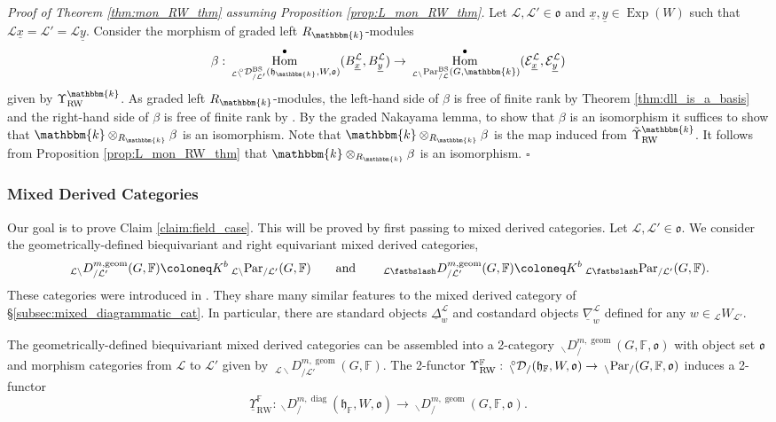 \documentclass{amsart}
\newcommand{\F}{\mathbb{F}}
\renewcommand{\k}{\mathbbm{k}}
\newcommand{\scrE}{\mathcal{E}}
\newcommand{\scrL}{\mathcal{L}}
\DeclareMathOperator{\Hom}{Hom}
\newcommand{\fr}[1]{\mathfrak{#1}}
\DeclareMathOperator{\RW}{RW}
\DeclareMathOperator{\diag}{diag}
\DeclareMathOperator{\BS}{BS}
\DeclareMathOperator{\geom}{geom}
\newcommand{\DGEE}[2]{\:_{#1 \backslash} D_{/ #2}^{m, \geom} }
\newcommand{\DGME}[2]{\:_{#1 \smallleftdash} D_{/ #2}^{m, \geom}}
\newcommand{\PME}[2]{\:_{#1 \smallleftdash} \textnormal{Par}_{/ #2} }
\newcommand{\PEE}[2]{\:_{#1 \backslash} \textnormal{Par}_{/ #2} }
\newcommand{\grEWmon}[2]{\:_{#1 \backslash} \!\! {}^{\circ} \mathcal{D}_{/ #2} }
\newcommand{\DDBE}[2]{\:_{#1 \backslash} D_{/ #2}^{m, \diag}}
\DeclareMathOperator{\Exp}{Exp}
\newcommand{\W}[2]{{}_{#1}W_{#2}}
\newcommand{\ux}{\underline{x}}
\newcommand{\uy}{\underline{y}}
\newcommand{\bfslash}{\mathbin{\fatbslash}}
\newcommand*\smallleftdash{\bfslash}
\theoremstyle{definition}
\newenvironment{midsecproof}[1]{\vspace{\topsep} \noindent \textit{Proof of #1.}}{\hfill $\square$}
\numberwithin{equation}{subsection}
\begin{document}
\begin{midsecproof}{Theorem \ref{thm:mon_RW_thm} assuming Proposition \ref{prop:L_mon_RW_thm}}
  Let $\scrL, \scrL' \in \fr{o}$ and $\ux, \uy \in \Exp (W)$ such that $\scrL \ux = \scrL' = \scrL \uy$.
  Consider the morphism of graded left $R_{\k}$-modules
  \[\beta : \Hom_{\grEWmon{\scrL}{\scrL'}^{\BS} (\fr{h}_{\k}, W, \fr{o})}^{\bullet} (B_{\ux}^{\scrL}, B_{\uy}^{\scrL}) \to  \Hom_{\PEE{\scrL}{\scrL}^{\BS} (G, \k)}^\bullet (\scrE_{\ux}^{\scrL}, \scrE_{\uy}^{\scrL})\]
  given by $\Upsilon_{\RW}^{\k}$.
  As graded left $R_{\k}$-modules, the left-hand side of $\beta$ is free of finite rank by Theorem \ref{thm:dll_is_a_basis} and the right-hand side of $\beta$ is free of finite rank by \cite[Lemma 3.6.3]{Sandvik}.
  By the graded Nakayama lemma, to show that $\beta$ is an isomorphism it suffices to show that $\k \otimes_{R_{\k}} \beta$ is an isomorphism.
  Note that $\k \otimes_{R_{\k}} \beta$ is the map induced from $\tilde{\Upsilon}_{\RW}^{\k}$.
  It follows from Proposition \ref{prop:L_mon_RW_thm} that $\k \otimes_{R_{\k}} \beta$ is an isomorphism.
\end{midsecproof}

\subsubsection{Mixed Derived Categories}\label{subsubsec:field_case_soergel}

Our goal is to prove Claim \ref{claim:field_case}. This will be proved by first passing to mixed derived categories. 
Let $\scrL, \scrL' \in \fr{o}$.
We consider the geometrically-defined biequivariant and right equivariant mixed derived categories,
\[\DGEE{\scrL}{\scrL'} (G, \F) \coloneq K^b \PEE{\scrL}{\scrL'} (G, \F) \qquad\text{and}\qquad \DGME{\scrL}{\scrL'} (G, \F) \coloneq K^b \PME{\scrL}{\scrL'} (G, \F).\]
These categories were introduced in \cite[\S 3.9]{Sandvik}. 
They share many similar features to the mixed derived category of \S\ref{subsec:mixed_diagrammatic_cat}.
In particular, there are standard objects $\underline{\Delta}_w^{\scrL}$ and costandard objects $\underline{\nabla}_w^{\scrL}$ defined for any $w \in \W{\scrL}{\scrL'}$.

The geometrically-defined biequivariant mixed derived categories can be assembled into a 2-category $\DGEE{}{} (G, \F, \fr{o})$ with object set $\fr{o}$ and morphism categories from $\scrL$ to $\scrL'$ given by $\DGEE{\scrL}{\scrL'} (G, \F)$.
The 2-functor  $\Upsilon_{\RW}^{\F} : \grEWmon{}{} (\fr{h}_{\F}, W, \fr{o}) \to \PEE{}{} (G, \F, \fr{o})$ induces a 2-functor
\[ \underline{\Upsilon}_{\RW}^{\F} :  \DDBE{}{} (\fr{h}_{\F}, W, \fr{o}) \to \DGEE{}{} (G, \F, \fr{o}).\]
\end{document}
